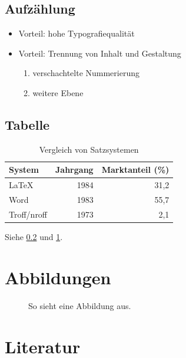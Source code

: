 \documentclass[12pt,a4paper]{article}
\begin{document}
\subsection{Aufzählung}
\begin{itemize}
  \item Vorteil: hohe Typografiequalität
  \item Vorteil: Trennung von Inhalt und Gestaltung
  \begin{enumerate}
    \item verschachtelte Nummerierung
    \item weitere Ebene
  \end{enumerate}
\end{itemize}

\subsection{Tabelle}
\label{tab:vergleich}
\begin{table}[htbp]
  \centering
  \caption{Vergleich von Satzsystemen}
  \label{tab:satzsysteme}
  \begin{tabular}{lrr}
    \toprule
    System        & {Jahrgang} & {Marktanteil (\%)} \\
    \midrule
    \LaTeX        & 1984 & 31,2 \\
    Word          & 1983 & 55,7 \\
    Troff/nroff   & 1973 &  2,1 \\
    \bottomrule
  \end{tabular}
\end{table}

Siehe \cref{tab:vergleich} und \cref{tab:satzsysteme}.

\section{Abbildungen}
\label{sec:figures}

\begin{figure}[htbp]
  \centering
  \caption{So sieht eine Abbildung aus.}
  \label{fig:placeholder}
\end{figure}

\section{Literatur}
\label{sec:literatur}
\end{document}
